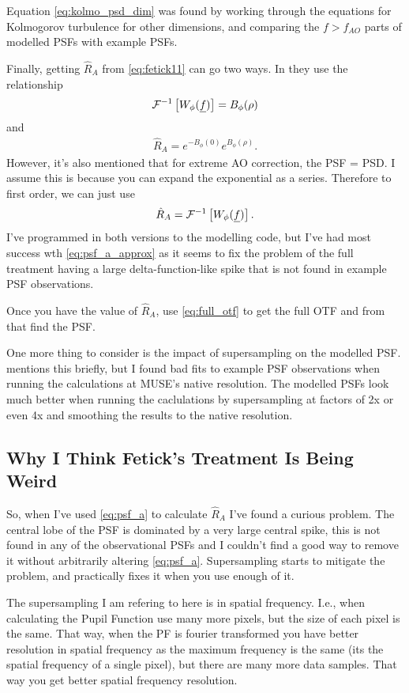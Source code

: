 Equation \eqref{eq:kolmo_psd_dim} was found by working through the equations for Kolmogorov turbulence for other dimensions, and comparing the $f>f_{AO}$ parts of modelled PSFs with example PSFs.

Finally, getting $\hat{R}_A$ from \eqref{eq:fetick11} can go two ways. In \cite{Fetick19} they use the relationship
\[
	\mathcal{F}^{-1}\left[ W_\phi(\underline{f}) \right] = B_\phi(\rho)
\]
and
\begin{align}
	\hat{R}_A = e^{-B_\phi(0)} e^{B_\phi(\rho)}.
	\label{eq:psf_a}
\end{align}
However, it's also mentioned \cite[section 2.3]{Fetick19} that for extreme AO correction, the PSF = PSD. I assume this is because you can expand the exponential as a series. Therefore to first order, we can just use
\begin{align}
	\hat{R}_A = \mathcal{F}^{-1}\left[ W_\phi(\underline{f}) \right].
	\label{eq:psf_a_approx}
\end{align}
I've programmed in both versions to the modelling code, but I've had most success wth \eqref{eq:psf_a_approx} as it seems to fix the problem of the full treatment having a large delta-function-like spike that is not found in example PSF observations.

Once you have the value of $\hat{R}_A$, use \eqref{eq:full_otf} to get the full OTF and from that find the PSF.

One more thing to consider is the impact of supersampling on the modelled PSF. \cite{Fetick19} mentions this briefly, but I found bad fits to example PSF observations when running the calculations at MUSE's native resolution. The modelled PSFs look much better when running the caclulations by supersampling at factors of 2x or even 4x and smoothing the results to the native resolution.


\subsection{Why I Think Fetick's Treatment Is Being Weird}
So, when I've used \eqref{eq:psf_a} to calculate $\hat{R}_A$ I've found a curious problem. The central lobe of the PSF is dominated by a very large central spike, this is not found in any of the observational PSFs and I couldn't find a good way to remove it without arbitrarily altering \eqref{eq:psf_a}. Supersampling starts to mitigate the problem, and practically fixes it when you use enough of it.

\begin{aside}
	The supersampling I am refering to here is in spatial frequency. I.e., when calculating the Pupil Function use many more pixels, but the size of each pixel is the same. That way, when the PF is fourier transformed you have better resolution in spatial frequency as the maximum frequency is the same (its the spatial frequency of a single pixel), but there are many more data samples. That way you get better spatial frequency resolution.
\end{aside}

